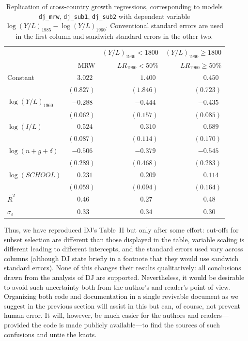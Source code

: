 \documentclass[10pt,a4paper,twoside]{article}
\let\code=\texttt
\begin{document}
\begin{table}[t]
\caption{\label{tab:dj}
  Replication of cross-country growth regressions, corresponding to
  models \code{dj\_mrw}, \code{dj\_sub1}, \code{dj\_sub2} with dependent
  variable $\log(Y/L)_{1985} - \log(Y/L)_{1960}$. Conventional standard errors
  are used in the first column and sandwich standard errors in the other two.}
\begin{center}
\begin{tabular}{lrrr} \hline
& & $(Y/L)_{1960} < 1800$ & $(Y/L)_{1960} \ge 1800$ \\
& MRW & $\mathit{LR}_{1960} < 50\%$ & $\mathit{LR}_{1960} \ge 50\%$ \\ \hline
Constant & $3.022\phantom{)}$ & $1.400\phantom{)}$ & $0.450\phantom{)}$ \\
 & $(0.827)$ & $(1.846)$ & $(0.723)$ \\
$\log(Y/L)_{1960}$ & $-0.288\phantom{)}$ & $-0.444\phantom{)}$ & $-0.435\phantom{)}$ \\
 & $(0.062)$ & $(0.157)$ & $(0.085)$ \\
$\log(I/L)$ & $0.524\phantom{)}$ & $0.310\phantom{)}$ & $0.689\phantom{)}$ \\
 & $(0.087)$ & $(0.114)$ & $(0.170)$ \\
$\log(n + g + \delta)$ & $-0.506\phantom{)}$ & $-0.379\phantom{)}$ & $-0.545\phantom{)}$ \\
 & $(0.289)$ & $(0.468)$ & $(0.283)$ \\
$\log(\mathit{SCHOOL})$ & $0.231\phantom{)}$ & $0.209\phantom{)}$ & $0.114\phantom{)}$ \\
 & $(0.059)$ & $(0.094)$ & $(0.164)$ \\ \hline
$\bar R^2$ & $0.46\phantom{0)}$ & $0.27\phantom{0)}$ & $0.48\phantom{0)}$ \\
$\sigma_\varepsilon$ & $0.33\phantom{0)}$ & $0.34\phantom{0)}$ & $0.30\phantom{0)}$ \\ \hline\end{tabular}
\end{center}
\end{table}

Thus, we have reproduced DJ's Table~II but only after some effort: cut-offs
for subset selection are different than those displayed in the table, variable scaling is different
leading to different intercepts, and the standard errors used vary across columns (although
DJ state briefly in a footnote that they would use sandwich standard errors). None of this
changes their results qualitatively: all conclusions drawn from the analysis of DJ are supported. 
Nevertheless, it would be desirable to avoid such uncertainty both from the author's
and reader's point of view. Organizing both code and documentation in a single revivable document
as we suggest in the previous section will assist in this but can, of
course, not prevent human error. It will, however, be much easier for the authors and readers---provided
the code is made publicly available---to find the sources of such confusions and untie the knots.
\end{document}
